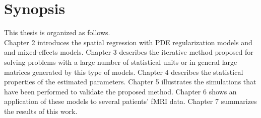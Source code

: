 
\chapter{Synopsis}
\label{ch:synopsis}

This thesis is organized as follows.\\
Chapter 2 introduces the spatial regression with PDE regularization
models and and mixed-effects models. Chapter 3 describes the iterative
method proposed for solving problems with a large number of
statistical units or in general large matrices generated by this
type of models.
Chapter 4 describes the statistical properties of the estimated parameters.
Chapter 5 illustrates the simulations that have been performed to
validate the proposed method. Chapter 6 shows an application of these
models to several patients' fMRI data. Chapter 7 summarizes the results
of this work.
